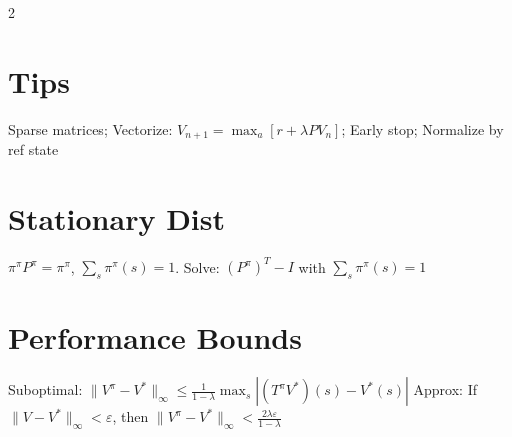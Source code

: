 \documentclass[8pt]{extarticle}
\begin{document}
\begin{multicols}{2}
\section*{\textcolor{algorithmgreen}{Tips}}
Sparse matrices; Vectorize: $V_{n+1} = \max_a [r + \lambda P V_n]$; Early stop; Normalize by ref state

\section*{\textcolor{formulared}{Stationary Dist}}
$\pi^\pi P^\pi = \pi^\pi$, $\sum_s \pi^\pi(s) = 1$. Solve: $(P^\pi)^T - I$ with $\sum_s \pi^\pi(s) = 1$

\section*{\textcolor{theoremblue}{Performance Bounds}}
Suboptimal: $\|V^\pi - V^*\|_\infty \leq \frac{1}{1-\lambda} \max_s |(T^\pi V^*)(s) - V^*(s)|$
Approx: If $\|V - V^*\|_\infty < \varepsilon$, then $\|V^\pi - V^*\|_\infty < \frac{2\lambda \varepsilon}{1-\lambda}$

\end{multicols}
\end{document}
